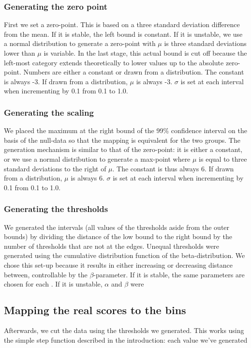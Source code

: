\documentclass[utf8]{FrontiersinVancouver}
\begin{document}
\subsubsection{Generating the zero point}
First we set a zero-point. This is based on a three standard deviation difference from the mean. If it is stable, the left bound is constant. If it is unstable, we use a normal distribution to generate a zero-point with $\mu$ is three standard deviations lower than $\mu$ is variable. In the last stage, this actual bound is cut off because the left-most category extends theoretically to lower values up to the absolute zero-point. Numbers are either a constant or drawn from a distribution. The constant is always -3. If drawn from a distribution, $\mu$ is always -3. $\sigma$ is set at each interval when incrementing by 0.1 from 0.1 to 1.0.

\subsubsection{Generating the scaling}
We placed the maximum at the right bound of the 99\% confidence interval on the basis of the null-data so that the mapping is equivalent for the two groups. The generation mechanism is similar to that of the zero-point: it is either a constant, or we use a normal distribution to generate a max-point where $\mu$ is equal to three standard deviations to the right of $\mu$. The constant is thus always 6. If drawn from a distribution, $\mu$ is always 6. $\sigma$ is set at each interval when incrementing by 0.1 from 0.1 to 1.0.

\subsubsection{Generating the thresholds}
We generated the intervals (all values of the thresholds aside from the outer bounds) by dividing the distance of the low bound to the right bound by the number of thresholds that are not at the edges. Unequal thresholds were generated using the cumulative distribution function of the beta-distribution. We chose this set-up because it results in either increasing or decreasing distance between, controllable by the $\beta$-parameter. If it is stable, the same parameters are chosen for each . If it is unstable, $\alpha$ and $\beta$ were 

\subsection{Mapping the real scores to the bins}
Afterwards, we cut the data using the thresholds we generated. This works using the simple step function described in the introduction: each value we've generated 
\end{document}
